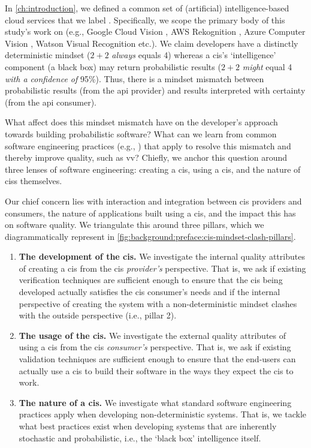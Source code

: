 \label{sec:background:preface}

In \cref{ch:introduction}, we defined a common set of (artificial) intelligence-based cloud services that we label . Specifically, we scope the primary body of this study's work on  (e.g., Google Cloud Vision \citep{GoogleCloud:Home}, AWS Rekognition \citep{AWS:Home}, Azure Computer Vision \citep{Azure:Home}, Watson Visual Recognition \citep{IBM:Home} etc.). We claim developers have a distinctly deterministic mindset ($2+2$ \textit{always}  equals 4) whereas a \gls{cis}'s `intelligence' component (a black box) may return probabilistic results ($2+2$ \textit{might} equal 4 \textit{with a confidence of} 95\%). Thus, there is a mindset mismatch between probabilistic results (from the \gls{api} provider) and results interpreted with certainty (from the \gls{api} consumer).

What affect does this mindset mismatch have on the developer's approach towards building probabilistic software? What can we learn from common software engineering practices (e.g., \citep{Pressman:2005vf,Sommerville:2011uc}) that apply to resolve this mismatch and thereby improve quality, such as \gls{vv}? Chiefly, we anchor this question around three lenses of software engineering: creating a \gls{cis}, using a \gls{cis}, and the nature of \glspl{cis} themselves.

Our chief concern lies with interaction and integration between \gls{cis} providers and consumers, the nature of applications built using a \gls{cis}, and the impact this has on software quality. We triangulate this around three pillars, which we diagrammatically represent in \cref{fig:background:preface:cis-mindset-clash-pillars}.
 
\begin{enumerate}[label=\textbf{\arabic*}.]
\item \textbf{The development of the \gls{cis}.} We investigate the internal quality attributes of creating a \gls{cis} from the \gls{cis} \textit{provider's} perspective. That is, we ask if existing verification techniques are sufficient enough to ensure that the \gls{cis} being developed actually satisfies the \gls{cis} consumer's needs and if the internal perspective of creating the system with a non-deterministic mindset clashes with the outside perspective (i.e., pillar 2).
\item \textbf{The usage of the \gls{cis}.} We investigate the external quality attributes of using a \gls{cis} from the \gls{cis} \textit{consumer's} perspective. That is, we ask if existing validation techniques are sufficient enough to ensure that the end-users can actually use a \gls{cis} to build their software in the ways they expect the \gls{cis} to work.
\item \textbf{The nature of a \gls{cis}.} We investigate what standard software engineering practices apply when developing non-deterministic systems. That is, we tackle what best practices exist when developing systems that are inherently stochastic and probabilistic, i.e., the `black box' intelligence itself.
\end{enumerate}

